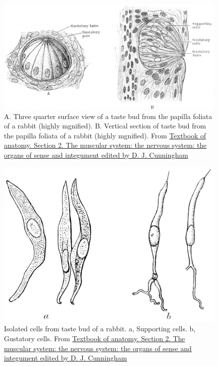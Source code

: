 \begin{figure}

{\centering \includegraphics[width=0.7\linewidth]{./figures/gustatory/CunninghamSection2Page771} 

}

\caption{A. Three quarter surface view of a taste bud from the papilla foliata of a rabbit (highly mgnified). B. Vertical section of taste bud from the papilla foliata of a rabbit (highly mgnified). From \href{https://wellcomelibrary.org/item/b21271070}{Textbook of anatomy. Section 2. The muscular system: the nervous system: the organs of sense and integument edited by D. J. Cunningham}}\label{fig:tastebuds}
\end{figure}



\begin{figure}

{\centering \includegraphics[width=0.7\linewidth]{./figures/gustatory/CunninghamSection2Page771Cells} 

}

\caption{Isolated cells from taste bud of a rabbit. a, Supporting cells. b, Gustatory cells. From \href{https://wellcomelibrary.org/item/b21271070}{Textbook of anatomy. Section 2. The muscular system: the nervous system: the organs of sense and integument edited by D. J. Cunningham}}\label{fig:tastecells}
\end{figure}

